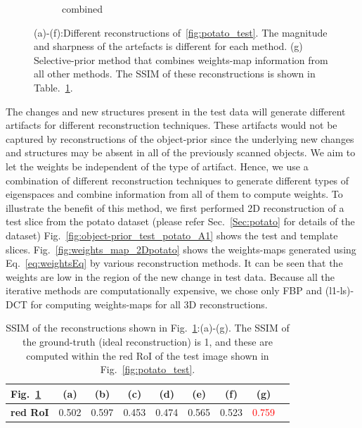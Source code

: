\documentclass[journal]{IEEEtran}
\begin{document}
\begin{figure}[!h]
\begin{subfigure}[b]{0.24\linewidth}
        \caption{combined}
     \end{subfigure}
      \caption{(a)-(f):Different reconstructions of~\ref{fig:potato_test}. The magnitude and sharpness of the artefacts is different for each method. (g) Selective-prior method that combines weights-map information from all other methods. The SSIM of these reconstructions is shown in Table.~\ref{table:potato_2D_ssim}.} 
\label{fig:reconstructions_diff_methods}
\end{figure}

The changes and new structures present in the test data will generate different artifacts for different reconstruction techniques. These artifacts would not be captured by reconstructions of the object-prior since the underlying new changes and structures may be absent in all of the previously scanned objects. We aim to let the weights be independent of the type of artifact. Hence, we use a combination of different reconstruction techniques to generate different types of eigenspaces and combine information from all of them to compute weights. To illustrate the benefit of this method, we first performed 2D reconstruction of a test slice from the potato dataset (please refer Sec.~\ref{Sec:potato} for details of the dataset) Fig.~\ref{fig:object-prior_test_potato_A1} shows the test and template slices. Fig.~\ref{fig:weights_map_2Dpotato}  shows the weights-maps generated using Eq.~\ref{eq:weightsEq} by various reconstruction methods. It can be seen that the weights are low in the region of the new change in test data. Because all the iterative methods are computationally expensive, we chose only FBP and (l1-ls)-DCT for computing weights-maps for all 3D reconstructions.  
\begin{table}[!h]
\caption{SSIM of the reconstructions shown in Fig.~\ref{fig:reconstructions_diff_methods}:(a)-(g). The SSIM of the ground-truth (ideal reconstruction) is 1, and these are computed within the red RoI of the test image shown in Fig.~\ref{fig:potato_test}.}
\begin{tabular}{|l|c|c|c|c|c|c|c|c|}
\hline
 Fig.~\ref{fig:reconstructions_diff_methods}  & \textbf{(a)} & \textbf{(b)} & \textbf{(c)} & \textbf{(d)} & \textbf{(e)} & \textbf{(f)} &  \textbf{(g)} \\\hline
\textbf{red RoI}  & 0.502 & 0.597  & 0.453 & 0.474 & 0.565 & 0.523 & \textcolor{red}{0.759} \\ \hline
\end{tabular}
\label{table:potato_2D_ssim}
\end{table}
\end{document}
